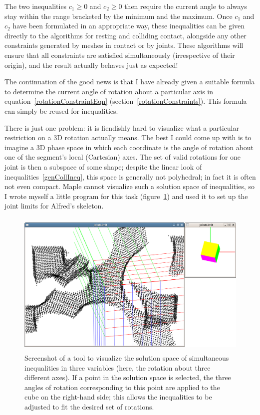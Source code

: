 The two inequalities $c_1 \ge 0$ and $c_2 \ge 0$ then require the current angle to always stay
within the range bracketed by the minimum and the maximum. Once $c_1$ and $c_2$ have been
formulated in an appropriate way, these inequalities can be given directly to the algorithms
for resting and colliding contact, alongside any other constraints generated by meshes in contact
or by joints. These algorithms will ensure that all constraints are satisfied simultaneously
(irrespective of their origin), and the result actually behaves just as expected!

The continuation of the good news is that I have already given a suitable formula to determine
the current angle of rotation about a particular axis in equation~\ref{rotationConstraintEqn}
(section~\ref{rotationConstraints}). This formula can simply be reused for inequalities.

There is just one problem: it is fiendishly hard to visualize what a particular restriction on
a 3D rotation actually means. The best I could come up with is to imagine a 3D phase space in
which each coordinate is the angle of rotation about one of the segment's local (Cartesian) axes.
The set of valid rotations for one joint is then a subspace of some shape; despite the linear
look of inequalities~\ref{genCollIneq}, this space is generally not polyhedral; in fact it is
often not even compact. Maple cannot visualize such a solution space of inequalities, so I wrote
myself a little program for this task (figure~\ref{jointLimit}) and used it to set up the joint
limits for Alfred's skeleton.

\begin{figure}
\centerline{\includegraphics[width=120mm,height=70.54mm]{figures/jointlimit}}
\caption{Screenshot of a tool to visualize the solution space of simultaneous inequalities in
    three variables (here, the rotation about three different axes). If a point in the solution
    space is selected, the three angles of rotation corresponding to this point are applied to the
    cube on the right-hand side; this allows the inequalities to be adjusted to fit the desired
    set of rotations.\label{jointLimit}}
\end{figure}
